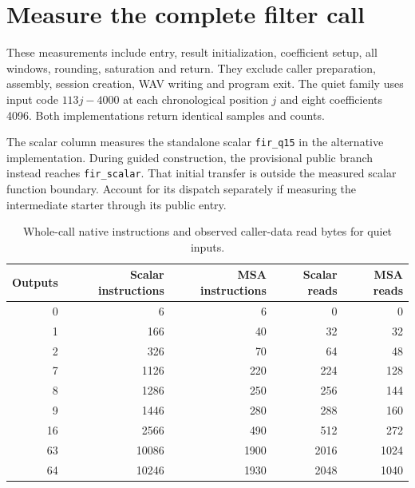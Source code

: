 \section{Measure the complete filter call}
These measurements include entry, result initialization, coefficient setup, all windows,
rounding, saturation and return. They exclude caller preparation, assembly, session
creation, WAV writing and program exit. The quiet family uses input code
\(113j-4000\) at each chronological position \(j\) and eight coefficients 4096.
Both implementations return identical samples and counts.

The scalar column measures the standalone scalar \texttt{fir\_q15} in the
alternative implementation. During guided construction, the provisional public branch
instead reaches \texttt{fir\_scalar}. That initial transfer is outside the measured
scalar function boundary. Account for its dispatch separately if measuring the
intermediate starter through its public entry.

\begin{table}[htbp]
  \centering
  \caption{Whole-call native instructions and observed caller-data read bytes for quiet inputs.}
  \begin{tabular}{rrrrr}
    \toprule
    Outputs & Scalar instructions & MSA instructions & Scalar reads & MSA reads \\
    \midrule
    0       & 6                   & 6                & 0            & 0         \\
    1       & 166                 & 40               & 32           & 32        \\
    2       & 326                 & 70               & 64           & 48        \\
    7       & 1126                & 220              & 224          & 128       \\
    8       & 1286                & 250              & 256          & 144       \\
    9       & 1446                & 280              & 288          & 160       \\
    16      & 2566                & 490              & 512          & 272       \\
    63      & 10086               & 1900             & 2016         & 1024      \\
    64      & 10246               & 1930             & 2048         & 1040      \\
    \bottomrule
  \end{tabular}
\end{table}


